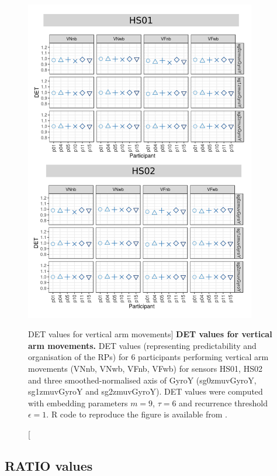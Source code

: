 \begin{figure}
\centering
\includegraphics[width=0.9\textwidth]{rqa_det_V_w500}
    \caption
	[DET values for vertical arm movements]{
	{\bf DET values for vertical arm movements.}	
    	DET values (representing predictability and organisation of the RPs)
	for 6 participants performing vertical arm movements 
	(VNnb, VNwb, VFnb, VFwb)
	for sensors HS01, HS02 and three smoothed-normalised axis 
	of GyroY (sg0zmuvGyroY, sg1zmuvGyroY and sg2zmuvGyroY).
	DET values were computed with 
	embedding parameters $m=9$, $\tau=6$ and recurrence threshold
	$\epsilon=1$.
	R code to reproduce the figure is available from \cite{xochicale2018}.
        }
    \label{fig:rqa_det_V}
\end{figure}


\newpage
\subsection{RATIO values}

